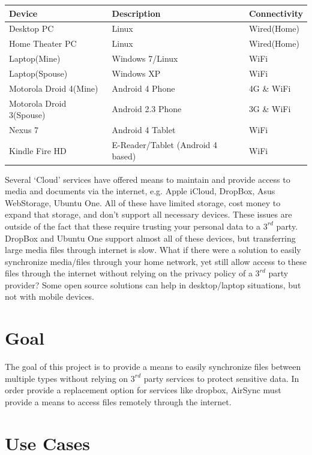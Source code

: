 \documentclass[12pt]{article}
\begin{document}
\footnotesize
\begin{center}
\begin{tabular}{|l|l|l|}
\hline
	\textbf{Device} & \textbf{Description} & \textbf{Connectivity}\\
\hline
	Desktop PC & Linux & Wired(Home)\\
\hline 
	Home Theater PC & Linux & Wired(Home)\\
\hline
	Laptop(Mine) & Windows 7/Linux & WiFi\\
\hline
	Laptop(Spouse) & Windows XP & WiFi\\
\hline
	Motorola Droid 4(Mine) & Android 4 Phone & 4G \& WiFi\\
\hline
	Motorola Droid 3(Spouse) & Android 2.3 Phone & 3G \& WiFi\\
\hline
	Nexus 7 & Android 4 Tablet & WiFi\\
\hline
	Kindle Fire HD & E-Reader/Tablet (Android 4 based) & WiFi\\
\hline
\end{tabular}
\end{center}
\normalsize
Several `Cloud' services have offered means to maintain and provide access to media and documents via the internet, e.g. Apple iCloud, DropBox, Asus WebStorage, Ubuntu One. All of these have limited storage, cost money to expand that storage, and don't support all necessary devices. These issues are outside of the fact that these require trusting your personal data to a $3^{rd}$ party. DropBox and Ubuntu One support almost all of these devices, but transferring large media files through internet is slow. What if there were a solution to easily synchronize media/files through your home network, yet still allow access to these files through the internet without relying on the privacy policy of a $3^{rd}$ party provider? Some open source solutions can help in desktop/laptop situations, but not with mobile devices.

\section{Goal}

The goal of this project is to provide a means to easily synchronize files between multiple types without relying on $3^{rd}$ party services to protect sensitive data. In order provide a replacement option for services like dropbox, AirSync must provide a means to access files remotely through the internet.

\section {Use Cases}
\end{document}
